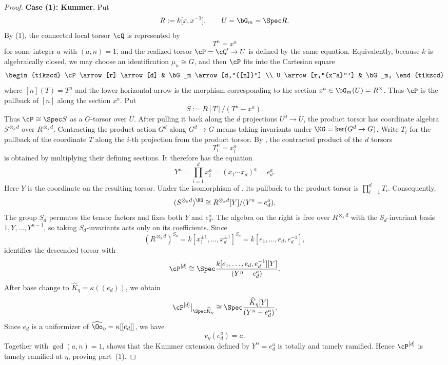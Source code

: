 \begin{proof}
\medskip
\noindent\textbf{Case (1): Kummer.}
Put
\[
    R:=k[x,x^{-1}],\qquad U=\bG_m=\Spec R.
\]
By (1), the connected local torsor $\cQ$ is
represented by
\[
    T^n=x^a
\]
for some integer $a$ with $(a,n)=1$, and the realized torsor
$\cP=\cQ'\to U$ is defined by the same equation. Equivalently, because
$k$ is algebraically closed, we may choose an identification $\mu_n\cong G$,
and then $\cP$ fits into the Cartesian square
\[
\begin{tikzcd}
    \cP \arrow[r] \arrow[d]
        & \bG_m \arrow[d,"{[n]}"] \\
    U \arrow[r,"{x^a}"']
        & \bG_m,
\end{tikzcd}
\]
where $[n](T)=T^n$ and the lower horizontal arrow is the morphism
corresponding to the section $x^a\in\bG_m(U)=R^\times$. Thus $\cP$ is the
pullback of $[n]$ along the section $x^a$. Put
\[
    S:=R[T]/(T^n-x^a).
\]
Thus $\cP\cong\Spec S$ as a $G$-torsor over $U$. After pulling it
back along the $d$ projections $U^d\to U$, the product torsor has
coordinate algebra $S^{\otimes_k d}$ over $R^{\otimes_k d}$. Contracting the
product action $G^d$ along $G^d\to G$ means taking invariants under
$\KG=\ker(G^d\to G)$. Write $T_i$ for the pullback of the coordinate $T$
along the $i$-th projection from the product torsor. By
, the contracted product of the
$d$ torsors
\[
    T_i^n=x_i^a
\]
is obtained by multiplying their defining sections. It therefore has the
equation
\[
    Y^n=\prod_{i=1}^d x_i^a
       =(x_1\cdots x_d)^a
       =e_d^a.
\]
Here $Y$ is the coordinate on the resulting torsor. Under the isomorphism
of , its pullback to the product
torsor is $\prod_{i=1}^d T_i$. Consequently,
\[
    (S^{\otimes_k d})^{\KG}
       \cong
    R^{\otimes_k d}[Y]/(Y^n-e_d^a).
\]
The group $S_d$ permutes the tensor factors and fixes both $Y$ and $e_d^a$.
The algebra on the right is free over $R^{\otimes_k d}$ with the
$S_d$-invariant basis $1,Y,\dots,Y^{n-1}$, so taking $S_d$-invariants acts
only on its coefficients. Since
\[
    (R^{\otimes_k d})^{S_d}
       =k[x_1^{\pm1},\dots,x_d^{\pm1}]^{S_d}
       =k[e_1,\dots,e_d,e_d^{-1}],
\]
 identifies the descended torsor with
\[
    \cP^{[d]}\cong
    \Spec\frac{k[e_1,\dots,e_d,e_d^{-1}][Y]}{(Y^n-e_d^a)}.
\]
After base change to $\widehat K_\eta=\kappa((e_d))$, we obtain
\[
    \cP^{[d]}\big|_{\Spec\widehat K_\eta}
       \cong
    \Spec\frac{\widehat K_\eta[Y]}{(Y^n-e_d^a)}.
\]
Since $e_d$ is a uniformizer of $\widehat\Oo_\eta=\kappa[[e_d]]$, we have
\[
    v_\eta(e_d^a)=a.
\]
Together with $\gcd(a,n)=1$,  shows that
the Kummer extension defined by $Y^n=e_d^a$ is totally and tamely ramified.
Hence $\cP^{[d]}$ is tamely ramified at $\eta$, proving part~(1).


\end{proof}
